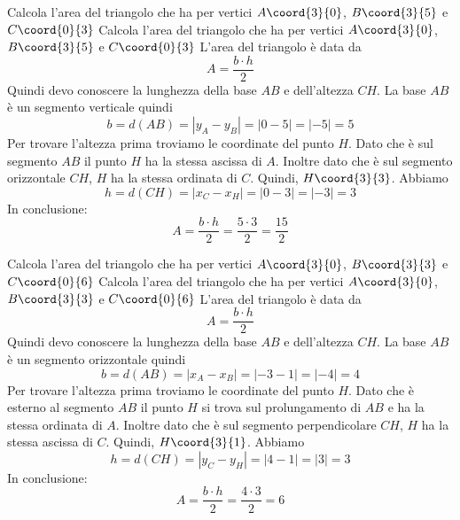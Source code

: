 \begin{exercise}
	Calcola l'area del triangolo che ha per vertici $A\coord{3}{0}$, $B\coord{3}{5}$ e $C\coord{0}{3}$
	\tcblower
	Calcola l'area del triangolo che ha per vertici $A\coord{3}{0}$, $B\coord{3}{5}$ e $C\coord{0}{3}$
	L'area del triangolo è data da \[A=\dfrac{b\cdot h}{2}\]
	Quindi devo conoscere la lunghezza della base $AB$ e dell'altezza $CH$.
	La base $AB$ è un segmento verticale quindi \[b=d(AB)=\left| y_A-y_B\right|=\left| 0-5\right|=\left|-5\right|=5   \]
	Per trovare l'altezza prima troviamo le coordinate del punto $H$. Dato che è sul segmento $AB$ il punto $H$ ha la stessa ascissa di $A$. Inoltre dato che è sul segmento orizzontale $CH$, $H$ ha la stessa ordinata di $C$. Quindi,  $H\coord{3}{3}$. Abbiamo \[h=d(CH)=\left| x_C-x_H\right|=\left| 0-3\right|=\left|-3\right|=3   \]In conclusione: \[A=\dfrac{b\cdot h}{2}=\dfrac{5\cdot 3}{2}=\dfrac{15}{2}\]
	\begin{center}
		
		\label{fig:AreaTriangolo3}
	\end{center}
\end{exercise}
\begin{exercise}
	Calcola l'area del triangolo che ha per vertici $A\coord{3}{0}$, $B\coord{3}{3}$ e $C\coord{0}{6}$
	\tcblower
		Calcola l'area del triangolo che ha per vertici $A\coord{3}{0}$, $B\coord{3}{3}$ e $C\coord{0}{6}$
	L'area del triangolo è data da \[A=\dfrac{b\cdot h}{2}\]
	Quindi devo conoscere la lunghezza della base $AB$ e dell'altezza $CH$.
	La base $AB$ è un segmento orizzontale quindi \[b=d(AB)=\left| x_A-x_B\right|=\left|-3-1\right|=\left|-4\right|=4   \]
	Per trovare l'altezza prima troviamo le coordinate del punto $H$. Dato che è esterno al segmento $AB$ il punto $H$ si trova sul prolungamento di $AB$ e ha la stessa ordinata di $A$. Inoltre dato che è sul segmento perpendicolare $CH$, $H$ ha la stessa ascissa di $C$. Quindi,  $H\coord{3}{1}$. Abbiamo \[h=d(CH)=\left| y_C-y_H\right|=\left| 4-1\right|=\left|3\right|=3   \]In conclusione: \[A=\dfrac{b\cdot h}{2}=\dfrac{4\cdot 3}{2}=6\]
	\begin{center}
		
		\label{fig:AreaTriangolo4}
	\end{center}
\end{exercise}